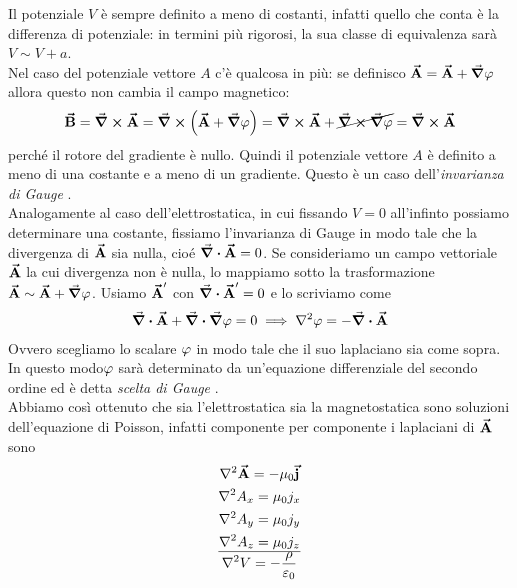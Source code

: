 Il potenziale $V$ è sempre definito a meno di costanti, infatti quello che conta è la differenza di potenziale: in termini più rigorosi, la sua classe di equivalenza sarà $V\sim V+a$. \\
Nel caso del potenziale vettore $A$ c'è qualcosa in più: se definisco $\vba A=\vba A+\grad\oldphi$ allora questo non cambia il campo magnetico:
\begin{gather*}
	\vba B=\curl\vba A=\curl \left( \vba A+\grad\oldphi\right)= \curl \vba A + \cancel{\curl\grad\oldphi}=\curl\vba A		
\end{gather*} 
perché il rotore del gradiente è nullo. Quindi il potenziale vettore $A$ è definito a meno di una costante e a meno di un gradiente. Questo è un caso dell'\textit{invarianza di Gauge}  .\\
Analogamente al caso dell'elettrostatica, in cui fissando $V=0$ all'infinto possiamo determinare una costante, fissiamo l'invarianza di Gauge in modo tale che la divergenza di $\vb*{\va{A}}$ sia nulla, cioé $\div \vb*{\va{A}}=0$. 
Se consideriamo un campo vettoriale $\vb*{\va{A}}$ la cui divergenza non è nulla, lo mappiamo sotto la trasformazione $\vb*{\va{A}}\sim \vb*{\va{A}}+\grad\varphi$. Usiamo $\vb*{\va{A}}'$ con $\div \vb*{\va{A}}'=0$ e lo scriviamo come
\begin{gather*}
	\div\vba A+\div\grad\oldphi=0 \implies \laplacian\oldphi= -\div\vba A
\end{gather*}
Ovvero scegliamo lo scalare $\oldphi$ in modo tale che il suo laplaciano sia come sopra. In questo modo$\oldphi$ sarà determinato da un'equazione differenziale del secondo ordine ed è detta \textit{scelta di Gauge} .\\
%

Abbiamo così ottenuto che sia l'elettrostatica sia la magnetostatica sono soluzioni dell'equazione di Poisson, infatti componente per componente i laplaciani di $\vb*{\va{A}}$ sono 
\begin{gather*}
	\laplacian\vba A=-\mu_0\vba j\\
	\laplacian A_x=\mu_0 j_x\\
	\laplacian A_y=\mu_0 j_y\\
	\laplacian A_z=\mu_0 j_z\\
	\hline
	\laplacian V=-\frac{\rho}{\epsilon_0}
\end{gather*}

